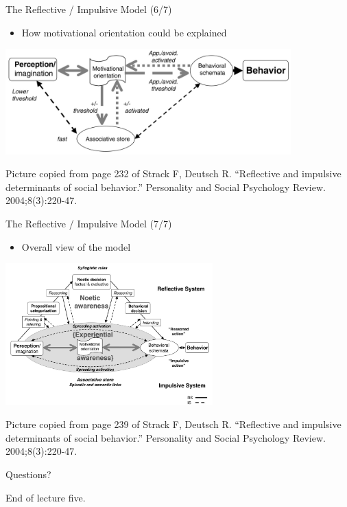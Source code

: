 \documentclass{beamer}
\begin{document}
\begin{frame}
{\centerline{The Reflective / Impulsive Model (6/7)}}
\begin{itemize}
    \item How motivational orientation could be explained
\end{itemize} 

\begin{center}

 \includegraphics[width=11cm]{P2023.AIBCCSS.KnowledgeAcquisitionRetentionUse/RI.MotivationalOrientation.jpg}
 
 \end{center}

\begin{center}
    \tiny{Picture copied from page 232 of Strack F, Deutsch R. ``Reflective and impulsive determinants of social behavior.'' Personality and Social Psychology Review. 2004;8(3):220-47.}
    \end{center}

\end{frame}


\begin{frame}
{\centerline{The Reflective / Impulsive Model (7/7)}}
\begin{itemize}
    \item Overall view of the model
\end{itemize} 

\begin{center}

 \includegraphics[width=8cm]{P2023.AIBCCSS.KnowledgeAcquisitionRetentionUse/RI.ComprehensiveView.jpg}
 
 \end{center}

\begin{center}
    \tiny{Picture copied from page 239 of Strack F, Deutsch R. ``Reflective and impulsive determinants of social behavior.'' Personality and Social Psychology Review. 2004;8(3):220-47.}
    \end{center}

\end{frame}

\begin{frame}
{\centerline{Questions?}}
\vspace{1cm}
\begin{center}
    \LARGE{End of lecture five.}
\end{center}

\end{frame}
\end{document}
